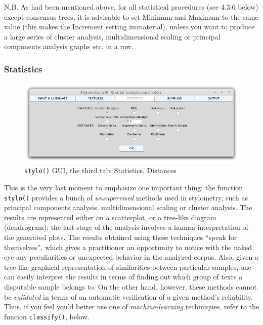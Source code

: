 \documentclass[11pt,a4paper]{article}
\def\margin#1{\marginpar{\textcolor{blue}{\footnotesize\tt #1}}}
\def\code#1{{\tt #1}}
\begin{document}
N.B. As had been mentioned above, for all statistical procedures (see
4.3.6 below) except consensus trees, it is advisable to set Minimum
and Maximum to the same value (this makes the Increment setting immaterial),
unless you want to produce a large series of cluster analysis, multidimensional
scaling or principal components analysis graphs etc. in a row.


\subsubsection{Statistics}

\begin{figure}
  \centering
  \includegraphics[width=0.8\linewidth]{img/stylo-gui_tab3.png}
  \caption{\code{stylo()} GUI, the third tab: Statistics, Distances}
\end{figure}


This is the very last moment to emphasize one important thing: the
function \code{stylo()} provides a bunch of \emph{unsupervised}
methods used in stylometry, such as principal components analysis,
multidimensional scaling or cluster analysis. The results are represented
either on a scatterplot, or a tree-like diagram (dendrogram); the
last stage of the analysis involves a human interpretation of the
generated plots.\margin{analysis.type=} The results obtained using
these techniques ``speak for themselves'', which gives a practitioner
an opportunity to notice with the naked eye any peculiarities or unexpected
behavior in the analyzed corpus. Also, given a tree-like graphical
representation of similarities between particular samples, one can
easily interpret the results in terms of finding out which group of
texts a disputable sample belongs to. On the other hand, however, these
methods cannot be \emph{validated} in terms of an automatic verification
of a given method's reliability. Thus, if you feel you'd better use
one of \emph{machine-learning} techiniques, refer to the 
funcion \code{classify()}, below.
\end{document}

